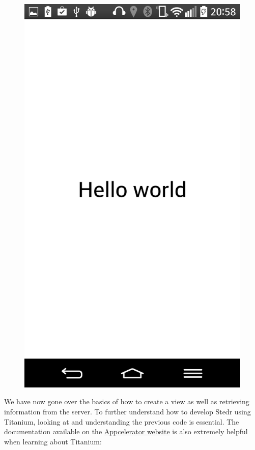 \begin{figure}
\begin{center}
\includegraphics[scale=0.10]{guide/f11.png} 
\end{center}
\end{figure}


We have now gone over the basics of how to create a view as well as retrieving information from the server. To further understand how to develop Stedr using Titanium, looking at and understanding the previous code is essential. The documentation available on the \href{http://docs.appcelerator.com/titanium/3.0/}{Appcelerator website} is also extremely helpful when learning about Titanium:
